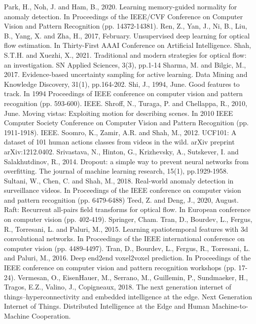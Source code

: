 \documentclass[sigplan,authorversion,nonacm, 9pt]{acmart}
\begin{document}
\begin{thebibliography}{00}
 Park, H., Noh, J. and Ham, B., 2020. Learning memory-guided normality for anomaly detection. In Proceedings of the IEEE/CVF Conference on Computer Vision and Pattern Recognition (pp. 14372-14381).
 Ren, Z., Yan, J., Ni, B., Liu, B., Yang, X. and Zha, H., 2017, February. Unsupervised deep learning for optical flow estimation. In Thirty-First AAAI Conference on Artificial Intelligence.
 Shah, S.T.H. and Xuezhi, X., 2021. Traditional and modern strategies for optical flow: an investigation. SN Applied Sciences, 3(3), pp.1-14
 Sharma, M. and Bilgic, M., 2017. Evidence-based uncertainty sampling for active learning. Data Mining and Knowledge Discovery, 31(1), pp.164-202.
 Shi, J., 1994, June. Good features to track. In 1994 Proceedings of IEEE conference on computer vision and pattern recognition (pp. 593-600). IEEE.
 Shroff, N., Turaga, P. and Chellappa, R., 2010, June. Moving vistas: Exploiting motion for describing scenes. In 2010 IEEE Computer Society Conference on Computer Vision and Pattern Recognition (pp. 1911-1918). IEEE.
 Soomro, K., Zamir, A.R. and Shah, M., 2012. UCF101: A dataset of 101 human actions classes from videos in the wild. arXiv preprint arXiv:1212.0402.
 Srivastava, N., Hinton, G., Krizhevsky, A., Sutskever, I. and Salakhutdinov, R., 2014. Dropout: a simple way to prevent neural networks from overfitting. The journal of machine learning research, 15(1), pp.1929-1958.
 Sultani, W., Chen, C. and Shah, M., 2018. Real-world anomaly detection in surveillance videos. In Proceedings of the IEEE conference on computer vision and pattern recognition (pp. 6479-6488)
 Teed, Z. and Deng, J., 2020, August. Raft: Recurrent all-pairs field transforms for optical flow. In European conference on computer vision (pp. 402-419). Springer, Cham.
 Tran, D., Bourdev, L., Fergus, R., Torresani, L. and Paluri, M., 2015. Learning spatiotemporal features with 3d convolutional networks. In Proceedings of the IEEE international conference on computer vision (pp. 4489-4497).
 Tran, D., Bourdev, L., Fergus, R., Torresani, L. and Paluri, M., 2016. Deep end2end voxel2voxel prediction. In Proceedings of the IEEE conference on computer vision and pattern recognition workshops (pp. 17-24).
 Vermesan, O., EisenHauer, M., Serrano, M., Guillemin, P., Sundmaeker, H., Tragos, E.Z., Valino, J., Copigneaux, 2018. The next generation internet of things–hyperconnectivity and embedded intelligence at the edge. Next Generation Internet of Things. Distributed Intelligence at the Edge and Human Machine-to-Machine Cooperation.

\end{thebibliography}
\end{document}
